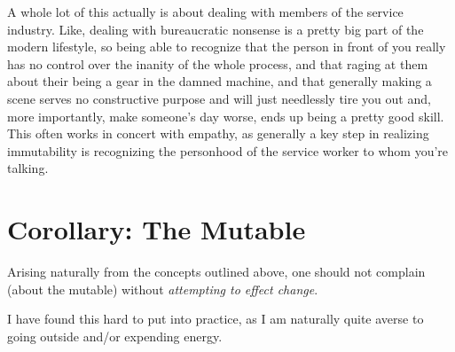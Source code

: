\documentclass[../butidigress.tex]{subfiles}
\begin{document}
A whole lot of this actually is about dealing with members of the service industry.
Like, dealing with bureaucratic nonsense is a pretty big part of the modern lifestyle, so being able to recognize that the person in front of you really has no control over the inanity of the whole process, and that raging at them about their being a gear in the damned machine, and that generally making a scene serves no constructive purpose and will just needlessly tire you out and, more importantly, make someone's day worse, ends up being a pretty good skill.
This often works in concert with empathy, as generally a key step in realizing immutability is recognizing the personhood of the service worker to whom you're talking.

\section{Corollary: The Mutable}
Arising naturally from the concepts outlined above, one should not complain (about the mutable) without \emph{attempting to effect change}.

I have found this hard to put into practice, as I am naturally quite averse to going outside and/or expending energy.
\end{document}

